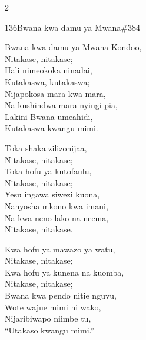 \documentclass{article}
\begin{document}
\begin{multicols}{2}
\begin{hymn}{136}{Bwana kwa damu ya Mwana}{\#384}
\begin{stanza}
Bwana kwa damu ya Mwana Kondoo,\\
Nitakase, nitakase;\\
Hali nimeokoka ninadai,\\
Kutakaswa, kutakaswa;\\
Nijapokosa mara kwa mara,\\
Na kushindwa mara nyingi pia,\\
Lakini Bwana umeahidi,\\
Kutakaswa kwangu mimi.
\end{stanza}
\begin{stanza}
Toka shaka zilizonijaa,\\
Nitakase, nitakase;\\
Toka hofu ya kutofaulu,\\
Nitakase, nitakase;\\
Yesu ingawa siwezi kuona,\\
Nanyosha mkono kwa imani,\\
Na kwa neno lako na neema,\\
Nitakase, nitakase.
\end{stanza}
\begin{stanza}
Kwa hofu ya mawazo ya watu,\\
Nitakase, nitakase;\\
Kwa hofu ya kunena na kuomba,\\
Nitakase, nitakase;\\
Bwana kwa pendo nitie nguvu,\\
Wote wajue mimi ni wako,\\
Nijaribiwapo niimbe tu,\\
``Utakaso kwangu mimi.''
\end{stanza}
\end{hymn}


\end{multicols}
\end{document}

